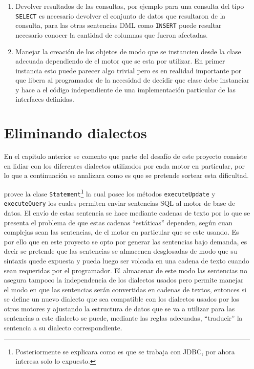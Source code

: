 \begin{enumerate}
%
\item Devolver resultados de las consultas, por ejemplo para una consulta del tipo \verb=SELECT= es necesario devolver el conjunto de datos que resultaron de la consulta, para las otras sentencias DML como \verb=INSERT= puede resultar necesario conocer la cantidad de columnas que fueron afectadas.
%
\item Manejar la creación de los objetos de modo que se instancien desde la clase adecuada dependiendo de el motor que se esta por utilizar. En primer instancia esto puede parecer algo trivial pero es en realidad importante por que libera al programador de la necesidad de decidir que clase debe instanciar y hace a el código independiente de una implementación particular de las interfaces definidas.
\end{enumerate}
%
%
\section{Eliminando dialectos}
\label{seccion:especificacion:dialectos}
En el capitulo anterior se comento que parte del desafío de este proyecto consiste en lidiar con los diferentes  dialectos utilizados por cada motor en particular, por lo que a continuación se analizara como es que se pretende sortear esta dificultad.

\jd provee la clase \verb=Statement=\footnote{Posteriormente se explicara como es que se trabaja con JDBC, por ahora interesa solo lo expuesto.} la cual posee los métodos \verb=executeUpdate= y \verb=executeQuery= los cuales permiten enviar sentencias SQL al motor de base de datos. El envío de estas sentencia se hace mediante cadenas de texto por lo que se presenta el problema de que estas cadenas ``estáticas'' dependen, según cuan complejas sean las sentencias, de el motor en particular que se este usando. Es por ello que en este proyecto se opto por generar las sentencias bajo demanda, es decir se pretende que las sentencias se almacenen desglosadas de modo que su sintaxis quede expuesta y pueda luego ser volcada en una cadena de texto cuando sean requeridas por el programador. El almacenar de este modo las sentencias no asegura tampoco la independencia de los dialectos usados pero permite manejar el modo en que las sentencias serán convertidas en cadenas de textos, entonces si se define un nuevo dialecto que sea compatible con los dialectos usados por los otros motores y ajustando la estructura de datos que se va a utilizar para las sentencias a este dialecto se puede, mediante las reglas adecuadas, ``traducir'' la sentencia a su dialecto correspondiente. 

